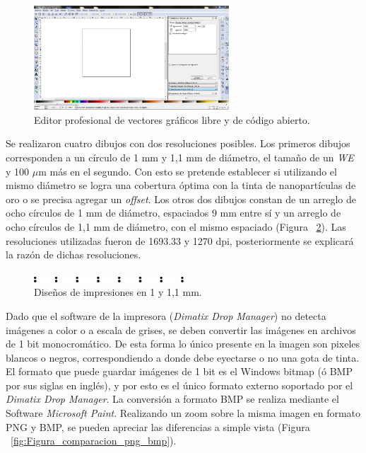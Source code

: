 \begin{figure}[H]
  \centering
    \includegraphics[width=0.65\textwidth]{Figuras/Figura_Inkscape}
  \caption{Editor profesional de vectores gráficos libre y de código abierto.}
  \label{fig:Figura_Inkscape}
\end{figure}

 Se realizaron cuatro dibujos con dos resoluciones posibles. Los primeros dibujos corresponden a un círculo de 1 mm y 1,1 mm de diámetro, el tamaño de un \emph{WE} y 100 $\mu$m más en el segundo. Con esto se pretende establecer si utilizando el mismo diámetro se logra una cobertura óptima con la tinta de nanopartículas de oro o se precisa agregar un \textit{offset}. Los otros dos dibujos constan de un arreglo de ocho círculos de 1 mm de diámetro, espaciados 9 mm entre sí y un arreglo de ocho círculos de 1,1 mm de diámetro, con el mismo espaciado (Figura ~\ref{fig:Figura_Diseno_Circulos}). Las resoluciones utilizadas fueron de 1693.33 y 1270 dpi, posteriormente se explicará la razón de dichas resoluciones.

\begin{figure}[H]
  \centering
    \includegraphics[width=0.5\textwidth]{Figuras/Figura_Diseno_Circulos}
  \caption{Diseños de impresiones en 1 y 1,1 mm.}
  \label{fig:Figura_Diseno_Circulos}
\end{figure}

Dado que el software de la impresora (\textit{Dimatix Drop Manager}) no detecta imágenes a color o a escala de grises, se deben convertir las imágenes en archivos de 1 bit monocromático. De esta forma lo único presente en la imagen son pixeles blancos o negros, correspondiendo a donde debe eyectarse o no una gota de tinta. El formato que puede guardar imágenes de 1 bit es el Windows bitmap (ó BMP por sus siglas en inglés), y por esto es el único formato externo soportado por el \textit{Dimatix Drop Manager}. La conversión a formato BMP se realiza mediante el Software \textit{Microsoft Paint}. Realizando un zoom sobre la misma imagen en formato PNG y BMP, se pueden apreciar las diferencias a simple vista (Figura ~\ref{fig:Figura_comparacion_png_bmp}).

